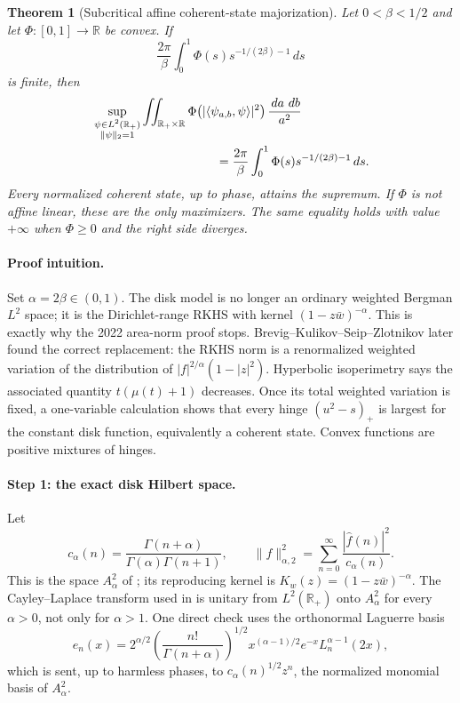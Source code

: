 \documentclass[11pt]{article}
\newtheorem*{theorem}{Theorem}
\newcommand{\R}{\mathbb R}
\newcommand{\dd}{\,d}
\begin{document}
\newpage
\begin{theorem}[Subcritical affine coherent-state majorization]
Let $0<\beta<1/2$ and let $\Phi:[0,1]\to\R$ be convex.  If
\[
 \frac{2\pi}{\beta}\int_0^1
 \Phi(s)s^{-1/(2\beta)-1}\dd s
\]
is finite, then
\begin{align*}
&\sup_{\substack{\psi\in L^2(\R_+)\\ \|\psi\|_2=1}}
 \iint_{\R_+\times\R}
 \Phi\!\left(|\langle\psi_{a,b},\psi\rangle|^2\right)
 \frac{\dd a\,\dd b}{a^2} \\
&\hspace{35mm}=
 \frac{2\pi}{\beta}\int_0^1
 \Phi(s)s^{-1/(2\beta)-1}\dd s .
\end{align*}
Every normalized coherent state, up to phase, attains the supremum.  If
$\Phi$ is not affine linear, these are the only maximizers.  The same equality
holds with value $+\infty$ when $\Phi\geq0$ and the right side diverges.
\end{theorem}

\paragraph{Proof intuition.}
Set $\alpha=2\beta\in(0,1)$.  The disk model is no longer an ordinary weighted
Bergman $L^2$ space; it is the Dirichlet-range RKHS with kernel
$(1-z\bar w)^{-\alpha}$.  This is exactly why the 2022 area-norm proof stops.
Brevig--Kulikov--Seip--Zlotnikov later found the correct replacement: the RKHS
norm is a renormalized weighted variation of the distribution of
$|f|^{2/\alpha}(1-|z|^2)$.  Hyperbolic isoperimetry says the associated
quantity $t(\mu(t)+1)$ decreases.  Once its total weighted variation is fixed,
a one-variable calculation shows that every hinge $(u^2-s)_+$ is largest for
the constant disk function, equivalently a coherent state.  Convex functions
are positive mixtures of hinges.

\paragraph{Step 1: the exact disk Hilbert space.}
Let
\[
 c_\alpha(n)=\frac{\Gamma(n+\alpha)}{\Gamma(\alpha)\Gamma(n+1)},
 \qquad
 \|f\|_{\alpha,2}^2=\sum_{n=0}^\infty
 \frac{|\widehat f(n)|^2}{c_\alpha(n)}.
\]
This is the space $A^2_\alpha$ of \cite{BKSZ}; its reproducing kernel is
$K_w(z)=(1-z\bar w)^{-\alpha}$.  The Cayley--Laplace transform used in
\cite{Frank} is unitary from $L^2(\R_+)$ onto $A^2_\alpha$ for every
$\alpha>0$, not only for $\alpha>1$.  One direct check uses the orthonormal
Laguerre basis
\[
 e_n(x)=2^{\alpha/2}\left(\frac{n!}{\Gamma(n+\alpha)}\right)^{1/2}
 x^{(\alpha-1)/2}e^{-x}L_n^{\alpha-1}(2x),
\]
which is sent, up to harmless phases, to
$c_\alpha(n)^{1/2}z^n$, the normalized monomial basis of $A^2_\alpha$.
\end{document}

